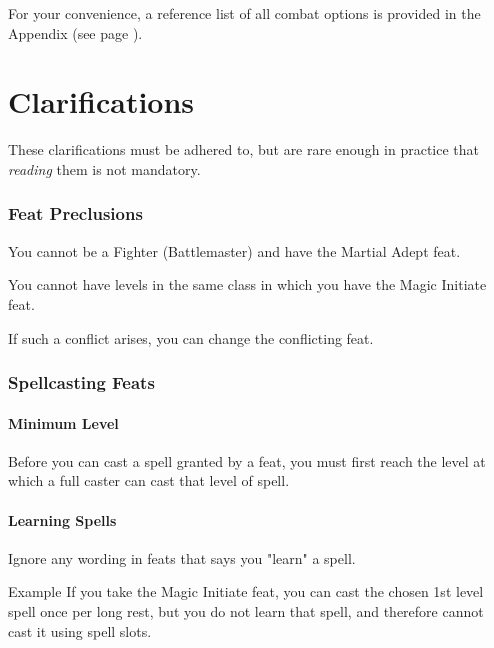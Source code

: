 \documentclass[letterpaper,twocolumn,openany,nodeprecatedcode,bg=print]{dndbook}
\newcommand{\pg}[1]{page \pageref{#1}}
\newcommand{\see}[1]{(see \pg{#1})}
\begin{document}
For your convenience, a reference list of all combat options is provided in the Appendix \see{combat-options}.















\chapter{Clarifications}

\noindent These clarifications must be adhered to, but are rare enough in practice that \textit{reading} them is not mandatory.

\subsection{Feat Preclusions}
You cannot be a Fighter (Battlemaster) and have the Martial Adept feat.

You cannot have levels in the same class in which you have the Magic Initiate feat.

If such a conflict arises, you can change the conflicting feat.

\subsection{Spellcasting Feats}

\subsubsection{Minimum Level}
Before you can cast a spell granted by a feat, you must first reach the level at which a full caster can cast that level of spell.

\subsubsection{Learning Spells}
Ignore any wording in feats that says you "learn" a spell.

\begin{DndComment}{Example}
If you take the Magic Initiate feat, you can cast the chosen 1st level spell once per long rest, but you do not learn that spell, and therefore cannot cast it using spell slots.
\end{DndComment}
\end{document}
